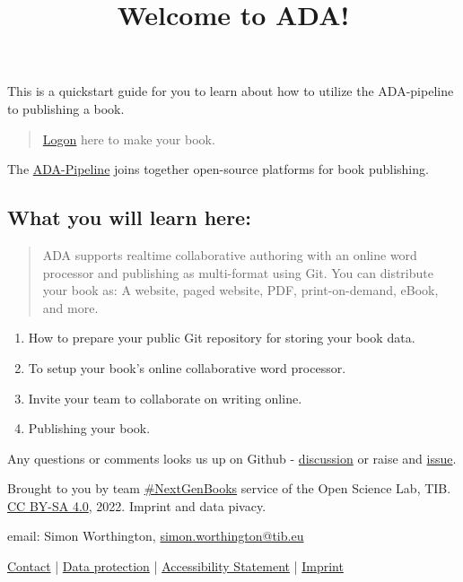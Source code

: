 \documentclass{article}
\begin{document}
\title{Welcome to ADA!}

\maketitle


This is a quickstart guide for you to learn about how to utilize the ADA-pipeline to publishing a book.

\begin{quote}



\href{https://write.handbuch.io/}{Logon} here to make your book.


\end{quote}


The \href{https://github.com/TIBHannover/ADA}{ADA-Pipeline} joins together open-source platforms for book publishing.


\subsection{What you will learn here:}\label{H7757657}


\begin{quote}



ADA supports realtime collaborative authoring with an online word processor and publishing as multi-format using Git. You can distribute your book as: A website, paged website, PDF, print-on-demand, eBook, and more.


\end{quote}

\begin{enumerate}
\item How to prepare your public Git repository for storing your book data.


\item To setup your book's online collaborative word processor.


\item Invite your team to collaborate on writing online.


\item Publishing your book. 


\end{enumerate}

Any questions or comments looks us up on Github - \href{https://github.com/TIBHannover/ADA/discussions}{discussion} or raise and \href{https://github.com/orgs/TIBHannover/projects/2}{issue}.


Brought to you by team \href{https://projects.tib.eu/nextgen-books/en/}{\#NextGenBooks} service of the Open Science Lab, TIB. \href{https://creativecommons.org/licenses/by-sa/4.0/}{CC BY-SA 4.0}, 2022. Imprint and data pivacy.


email: Simon Worthington, \href{mailto:simon.worthington@tib.eu}{simon.worthington@tib.eu}


\href{https://projects.tib.eu/nextgen-books/en/contact/}{Contact} | \href{https://projects.tib.eu/nextgen-books/en/data-protection/}{Data protection} | \href{https://projects.tib.eu/nextgen-books/en/accessibility-statement/}{Accessibility Statement} | \href{https://projects.tib.eu/nextgen-books/en/imprint/}{Imprint}
\end{document}
